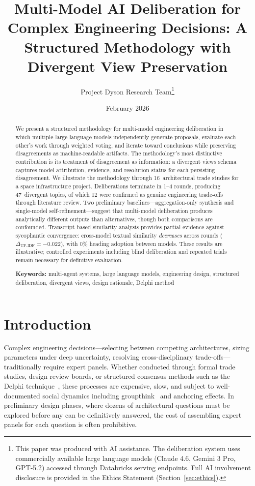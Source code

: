 \documentclass[11pt,a4paper]{article}
\title{\textbf{Multi-Model AI Deliberation for Complex Engineering Decisions: A Structured Methodology with Divergent View Preservation}}
\author{Project Dyson Research Team\thanks{This paper was produced with AI assistance. The deliberation system uses commercially available large language models (Claude 4.6, Gemini 3 Pro, GPT-5.2) accessed through Databricks serving endpoints. Full AI involvement disclosure is provided in the Ethics Statement (Section~\ref{sec:ethics}).}}
\affil{Project Dyson --- Open-Source Space Infrastructure Initiative\\ \texttt{https://projectdyson.org}}
\date{February 2026}
\begin{document}
\maketitle

\begin{abstract}
We present a structured methodology for multi-model engineering deliberation in which multiple large language models independently generate proposals, evaluate each other's work through weighted voting, and iterate toward conclusions while preserving disagreements as machine-readable artifacts. The methodology's most distinctive contribution is its treatment of disagreement as information: a divergent views schema captures model attribution, evidence, and resolution status for each persisting disagreement. We illustrate the methodology through 16~architectural trade studies for a space infrastructure project. Deliberations terminate in 1--4 rounds, producing 47~divergent topics, of which 12 were confirmed as genuine engineering trade-offs through literature review. Two preliminary baselines---aggregation-only synthesis and single-model self-refinement---suggest that multi-model deliberation produces analytically different outputs than alternatives, though both comparisons are confounded. Transcript-based similarity analysis provides partial evidence against sycophantic convergence: cross-model textual similarity \emph{decreases} across rounds ($\Delta_{\text{TF-IDF}} = -0.022$), with 0\% heading adoption between models. These results are illustrative; controlled experiments including blind deliberation and repeated trials remain necessary for definitive evaluation.

\medskip
\noindent\textbf{Keywords:} multi-agent systems, large language models, engineering design, structured deliberation, divergent views, design rationale, Delphi method
\end{abstract}

\onehalfspacing

\section{Introduction}
\label{sec:introduction}

Complex engineering decisions---selecting between competing architectures, sizing parameters under deep uncertainty, resolving cross-disciplinary trade-offs---traditionally require expert panels. Whether conducted through formal trade studies, design review boards, or structured consensus methods such as the Delphi technique~\cite{linstone1975delphi}, these processes are expensive, slow, and subject to well-documented social dynamics including groupthink~\cite{janis1982groupthink} and anchoring effects. In preliminary design phases, where dozens of architectural questions must be explored before any can be definitively answered, the cost of assembling expert panels for each question is often prohibitive.
\end{document}
